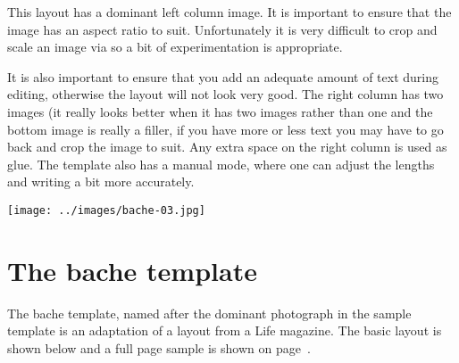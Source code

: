\begin{bache}

This layout has a dominant left column image. It is important to
ensure that the image has an aspect ratio to suit. Unfortunately
it is very difficult to crop and scale an image via \tex so a bit
of experimentation is appropriate.

It is also important to ensure that you add an adequate amount
of text during editing, otherwise the layout will not look very good. The right
column has two images (it really looks better when it has two images rather than
one and the bottom image is really a filler, if you have more or less
text you may have to go back and crop the image to suit. Any extra space on the right column is used as glue. The template also has a manual mode, where one can adjust the lengths and writing
a bit more accurately. \label{bache}

\vfill\vfill

\hbox{\noindent\texttt{[image: ../images/bache-03.jpg]}}%

\end{bache}

\restoregeometry


\section{The bache template}

The bache template, named after the dominant photograph in the sample template
is an adaptation of a layout from a Life magazine. The basic layout is shown below and
a full page sample is shown on page~\pageref{bache}.

{\begin{center}


\end{center}
}

